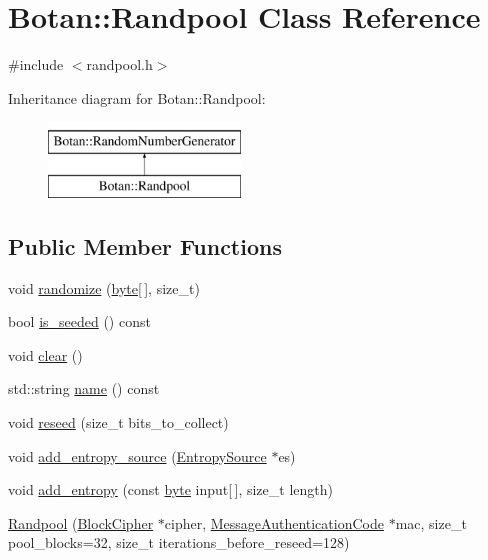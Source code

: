 \hypertarget{classBotan_1_1Randpool}{\section{Botan\-:\-:Randpool Class Reference}
\label{classBotan_1_1Randpool}
}


{\ttfamily \#include $<$randpool.\-h$>$}

Inheritance diagram for Botan\-:\-:Randpool\-:\begin{figure}[H]
\begin{center}
\leavevmode
\includegraphics[height=2.000000cm]{classBotan_1_1Randpool}
\end{center}
\end{figure}
\subsection*{Public Member Functions}
\begin{DoxyCompactItemize}
\item 
void \hyperlink{classBotan_1_1Randpool_a3c03664e954bc57a8a94631d72b03bf6}{randomize} (\hyperlink{namespaceBotan_a7d793989d801281df48c6b19616b8b84}{byte}\mbox{[}$\,$\mbox{]}, size\-\_\-t)
\item 
bool \hyperlink{classBotan_1_1Randpool_af5bf6236669b678ff2d200a557d2237f}{is\-\_\-seeded} () const 
\item 
void \hyperlink{classBotan_1_1Randpool_a253518157f15fff3788aafa5aafa05b4}{clear} ()
\item 
std\-::string \hyperlink{classBotan_1_1Randpool_afc2ef3d92acd3e957f3c148b5ee383f9}{name} () const 
\item 
void \hyperlink{classBotan_1_1Randpool_a096382d90828ef741c82c2cdfc5597cd}{reseed} (size\-\_\-t bits\-\_\-to\-\_\-collect)
\item 
void \hyperlink{classBotan_1_1Randpool_a43de9f43de5827031c017f278ff41006}{add\-\_\-entropy\-\_\-source} (\hyperlink{classBotan_1_1EntropySource}{Entropy\-Source} $\ast$es)
\item 
void \hyperlink{classBotan_1_1Randpool_ae04f6a4a6b53f8abbcc285210ad71f4e}{add\-\_\-entropy} (const \hyperlink{namespaceBotan_a7d793989d801281df48c6b19616b8b84}{byte} input\mbox{[}$\,$\mbox{]}, size\-\_\-t length)
\item 
\hyperlink{classBotan_1_1Randpool_a7e30d1ee20e7c8316271dda56bb04cd6}{Randpool} (\hyperlink{classBotan_1_1BlockCipher}{Block\-Cipher} $\ast$cipher, \hyperlink{classBotan_1_1MessageAuthenticationCode}{Message\-Authentication\-Code} $\ast$mac, size\-\_\-t pool\-\_\-blocks=32, size\-\_\-t iterations\-\_\-before\-\_\-reseed=128)
\end{DoxyCompactItemize}
